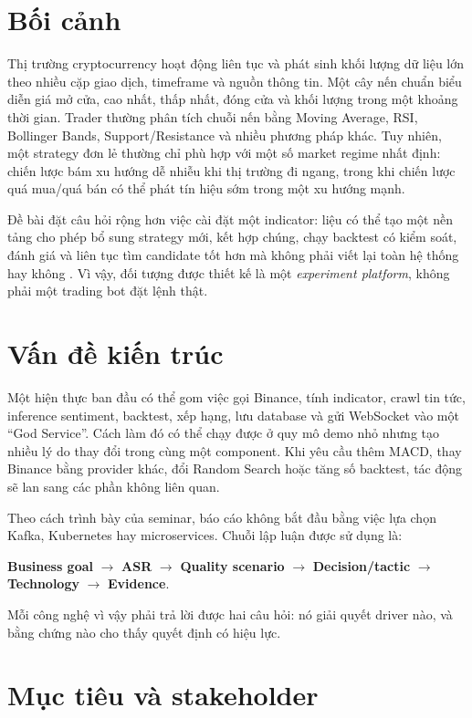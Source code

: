 \documentclass[12pt,a4paper,oneside]{report}
\begin{document}
\section{Bối cảnh}

Thị trường cryptocurrency hoạt động liên tục và phát sinh khối lượng dữ liệu lớn theo nhiều cặp giao dịch, timeframe và nguồn thông tin. Một cây nến chuẩn biểu diễn giá mở cửa, cao nhất, thấp nhất, đóng cửa và khối lượng trong một khoảng thời gian. Trader thường phân tích chuỗi nến bằng Moving Average, RSI, Bollinger Bands, Support/Resistance và nhiều phương pháp khác. Tuy nhiên, một strategy đơn lẻ thường chỉ phù hợp với một số market regime nhất định: chiến lược bám xu hướng dễ nhiễu khi thị trường đi ngang, trong khi chiến lược quá mua/quá bán có thể phát tín hiệu sớm trong một xu hướng mạnh.

Đề bài đặt câu hỏi rộng hơn việc cài đặt một indicator: liệu có thể tạo một nền tảng cho phép bổ sung strategy mới, kết hợp chúng, chạy backtest có kiểm soát, đánh giá và liên tục tìm candidate tốt hơn mà không phải viết lại toàn hệ thống hay không \cite{de-bai}. Vì vậy, đối tượng được thiết kế là một \emph{experiment platform}, không phải một trading bot đặt lệnh thật.

\section{Vấn đề kiến trúc}

Một hiện thực ban đầu có thể gom việc gọi Binance, tính indicator, crawl tin tức, inference sentiment, backtest, xếp hạng, lưu database và gửi WebSocket vào một ``God Service''. Cách làm đó có thể chạy được ở quy mô demo nhỏ nhưng tạo nhiều lý do thay đổi trong cùng một component. Khi yêu cầu thêm MACD, thay Binance bằng provider khác, đổi Random Search hoặc tăng số backtest, tác động sẽ lan sang các phần không liên quan.

Theo cách trình bày của seminar, báo cáo không bắt đầu bằng việc lựa chọn Kafka, Kubernetes hay microservices. Chuỗi lập luận được sử dụng là:
\begin{center}
\textbf{Business goal} $\rightarrow$ \textbf{ASR} $\rightarrow$ \textbf{Quality scenario}
$\rightarrow$ \textbf{Decision/tactic} $\rightarrow$ \textbf{Technology} $\rightarrow$ \textbf{Evidence}.
\end{center}
Mỗi công nghệ vì vậy phải trả lời được hai câu hỏi: nó giải quyết driver nào, và bằng chứng nào cho thấy quyết định có hiệu lực.

\section{Mục tiêu và stakeholder}
\end{document}
